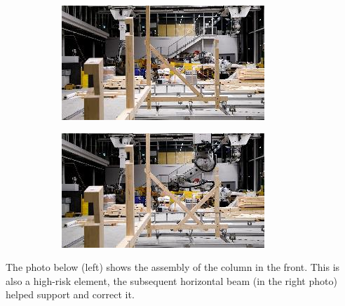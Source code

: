 \documentclass[11pt]{book}
\begin{document}
\begin{figure}[H]
\centering
\begin{subfigure}[b]{0.45\textwidth}
\centering
\includegraphics[width=\textwidth]{./images/image65.jpeg}
\end{subfigure}
\hfill
\begin{subfigure}[b]{0.45\textwidth}
\centering
\includegraphics[width=\textwidth]{./images/image66.jpeg}
\end{subfigure}
\end{figure}


The photo below (left) shows the assembly of the column in the front. This is also a high-risk element, the subsequent horizontal beam (in the right photo) helped support and correct it.
\end{document}
